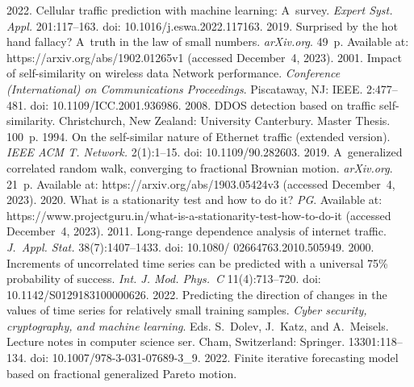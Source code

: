 \begin{multicols}{2}
{{\begin{thebibliography}{99}
 2022. Cellular traffic prediction with machine learning: 
A~survey. \textit{Expert Syst. Appl.} 201:117--163. doi: 
10.1016/j.eswa.2022.117163.
 2019. Surprised by the hot hand fallacy? A~truth 
in the law of small numbers. \textit{arXiv.org}. 49~p. Available at: {\sf 
https://arxiv.org/abs/1902.01265v1} (accessed December~4, 2023).
 2001. Impact of  
self-similarity on wireless data Network performance. \textit{Conference 
(International) on Communications Proceedings}. 
Piscataway, NJ: IEEE. 2:477--481. doi: 10.1109/ICC.2001.936986.
 2008. DDOS detection based on traffic self-similarity. 
 Christchurch, New Zealand: University Canterbury. Master Thesis. 100~p.
 1994. On 
the self-similar nature of Ethernet traffic (extended version). \textit{IEEE ACM T. 
Network.} 2(1):1--15. doi: 10.1109/90.282603.
 2019. A~generalized 
correlated random walk, converging to fractional Brownian motion. 
\textit{arXiv.org}. 21~p. Available at: {\sf https://arxiv.org/abs/1903.05424v3} 
(accessed December~4, 2023).
 2020. What is a stationarity test and how to do it? 
\textit{PG}. Available at: {\sf  
https://www.\linebreak projectguru.in/what-is-a-stationarity-test-how-to-do-it} (accessed 
December~4, 2023).
 2011. Long-range 
dependence analysis of internet traffic. \textit{J.~Appl. Stat.} 38(7):1407--1433. 
doi: 10.1080/ 02664763.2010.505949.
 2000. Increments of uncorrelated time series 
can be predicted with a universal 75\% probability of success. \textit{Int. J. Mod. 
Phys.~C} 11(4):713--720. doi: 10.1142/S0129183100000626.
 2022. Predicting the direction of changes in the values of time 
series for relatively small training samples. \textit{Cyber security, cryptography, 
and machine learning}. Eds. S.~Dolev, J.~Katz, 
and A.~Meisels. Lecture notes in computer science ser. Cham, Switzerland: 
Springer. 13301:118--134. doi: 10.1007/978-3-031-07689-3\_9. 
 2022. Finite 
iterative forecasting model based on fractional generalized Pareto motion. 

\end{thebibliography}}}
\end{multicols}
